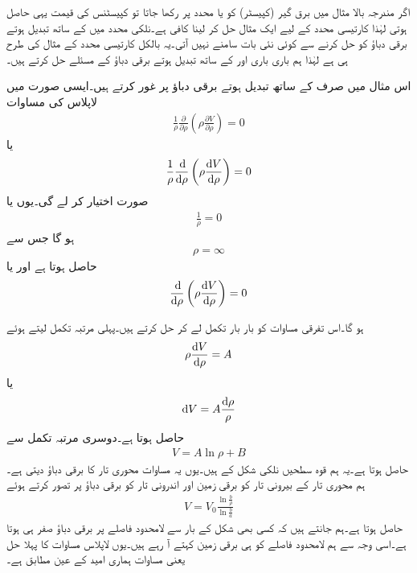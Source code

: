 اگر مندرجہ بالا مثال میں برق گیر (کپیسٹر)  کو  یا  محدد پر رکھا جاتا تو کپیسٹنس کی قیمت یہی حاصل ہوتی لہٰذا کارتیسی محدد کے لیے ایک مثال حل کر لینا کافی ہے۔نلکی محدد میں  کے ساتھ تبدیل ہوتے برقی دباؤ کو حل کرنے سے کوئی نئی بات سامنے نہیں آتی۔یہ بالکل کارتیسی محدد کے مثال کی طرح ہی ہے لہٰذا ہم باری باری  اور  کے ساتھ تبدیل ہوتے برقی دباؤ کے مسئلے حل کرتے ہیں۔


اس مثال میں صرف  کے ساتھ تبدیل ہوتے برقی دباؤ پر غور کرتے ہیں۔ایسی صورت میں لاپلاس کی مساوات
\begin{align*}
\frac{1}{\rho} \frac{\partial}{\partial \rho} \left(\rho \frac{\partial V}{\partial \rho} \right)=0
\end{align*}
یا
\begin{align}\label{مساوات_لاپلاس_ہم_محوری_لاپلاسی}
\frac{1}{\rho}\frac{\dif}{\dif \rho} \left(\rho \frac{\dif V}{\dif \rho} \right)=0
\end{align}
صورت اختیار کر لے گی۔یوں یا
\begin{align*}
\frac{1}{\rho}=0
\end{align*}
ہو گا جس سے
\begin{align}\label{مساوات_لاپلاس_ہم_محوری_لاپلاسی_پہلا-حل}
\rho=\infty
\end{align}
حاصل ہوتا ہے اور یا
\begin{align}\label{مساوات_لاپلاس_ہم_محوری_لاپلاسی_ب}
\frac{\dif}{\dif \rho} \left(\rho \frac{\dif V}{\dif \rho} \right)=0
\end{align}

ہو گا۔اس تفرقی مساوات کو بار بار تکمل لے کر حل کرتے ہیں۔پہلی مرتبہ تکمل لیتے ہوئے
\begin{align*}
\rho \frac{\dif V}{\dif \rho}=A
\end{align*}
یا
\begin{align*}
\dif V=A \frac{\dif \rho}{\rho}
\end{align*}
حاصل ہوتا ہے۔دوسری مرتبہ تکمل سے
\begin{align*}
V=A \ln \rho+B
\end{align*}
حاصل ہوتا ہے۔یہ ہم قوہ سطحیں نلکی شکل کے ہیں۔یوں یہ مساوات محوری تار کا برقی دباؤ دیتی ہے۔ہم محوری تار کے بیرونی تار  کو برقی زمین اور اندرونی تار  کو  برقی دباؤ پر تصور کرتے ہوئے
\begin{align}\label{مساوات_لاپلاس_ہم_محوری_لاپلاسی_ب_حل}
V=V_0 \frac{\ln \frac{b}{\rho} }{\ln \frac{b}{a} }
\end{align}
حاصل ہوتا ہے۔ہم جانتے ہیں کہ کسی بھی شکل کے بار سے لامحدود فاصلے پر برقی دباؤ صفر ہی ہوتا ہے۔اسی وجہ سے ہم لامحدود فاصلے کو ہی برقی زمین کہتے آ رہے ہیں۔یوں لاپلاس مساوات کا پہلا حل یعنی مساوات  ہماری امید کے عین مطابق ہے۔

